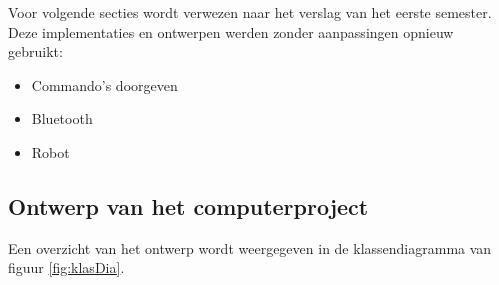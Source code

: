 \documentclass[tt2]{penoverslag}
\begin{document}
Voor volgende secties wordt verwezen naar het verslag van het eerste semester. Deze implementaties en ontwerpen werden zonder aanpassingen opnieuw gebruikt:

\begin{itemize}
\item Commando's doorgeven
\item Bluetooth
\item Robot
\end{itemize}

\subsection{Ontwerp van het computerproject}
\label{ssec:Sdesign}
Een overzicht van het ontwerp wordt weergegeven in de klassendiagramma van figuur \ref{fig:klasDia}.\\
\end{document}
